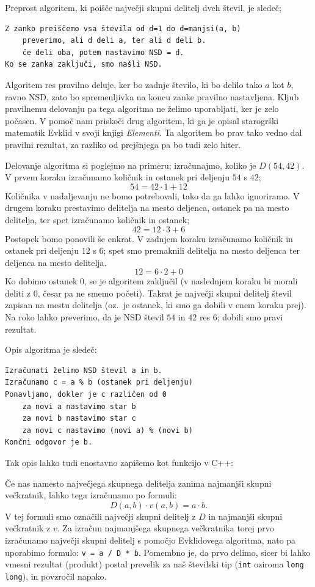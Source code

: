 \documentclass{book}
\begin{document}
Preprost algoritem, ki poišče največji skupni delitelj dveh števil, je sledeč;
\begin{verbatim}
Z zanko preiščemo vsa števila od d=1 do d=manjsi(a, b)
    preverimo, ali d deli a, ter ali d deli b.
    če deli oba, potem nastavimo NSD = d.
Ko se zanka zaključi, smo našli NSD.
\end{verbatim}
Algoritem res pravilno deluje, ker bo zadnje število, ki bo delilo tako $a$ kot
$b$, ravno NSD, zato bo spremenljivka na koncu zanke pravilno nastavljena.
Kljub pravilnemu delovanju pa tega algoritma ne želimo uporabljati, ker je zelo
počasen.
V pomoč nam priskoči drug algoritem, ki ga je opisal starogrški matematik Evklid
v svoji knjigi \emph{Elementi}.
Ta algoritem bo prav tako vedno dal pravilni rezultat, za razliko od prejšnjega
pa bo tudi zelo hiter.
\begin{examples}
  Delovanje algoritma si poglejmo na primeru; izračunajmo, koliko je $D(54,
  42)$.
  V prvem koraku izračunamo količnik in ostanek pri deljenju $54$ s $42$;
  \[
	54 = 42 \cdot 1 + 12
  \]
  Količnika v nadaljevanju ne bomo potrebovali, tako da ga lahko ignoriramo.
  V drugem koraku prestavimo delitelja na mesto deljenca, ostanek pa na mesto
  delitelja, ter spet izračunamo količnik in ostanek;
  \[
	42 = 12 \cdot 3 + 6
  \]
  Postopek bomo ponovili še enkrat.
  V zadnjem koraku izračunamo količnik in ostanek pri deljenju $12$ s $6$; spet
  smo premaknili delitelja na mesto deljenca ter deljenca na mesto delitelja.
  \[
	12 = 6 \cdot 2 + 0
  \]
  Ko dobimo ostanek $0$, se je algoritem zaključil (v naslednjem koraku bi
  morali deliti z $0$, česar pa ne smemo početi).
  Takrat je največji skupni delitelj števil zapisan na mestu delitelja
  (oz.~je ostanek, ki smo ga dobili v enem koraku prej).
  Na roko lahko preverimo, da je NSD števil $54$ in $42$ res $6$; dobili smo
  pravi rezultat.
\end{examples}

Opis algoritma je sledeč:
\begin{verbatim}
Izračunati želimo NSD števil a in b.
Izračunamo c = a % b (ostanek pri deljenju)
Ponavljamo, dokler je c različen od 0
    za novi a nastavimo star b
    za novi b nastavimo star c
    za novi c nastavimo (novi a) % (novi b)
Končni odgovor je b.
\end{verbatim}
Tak opis lahko tudi enostavno zapišemo kot funkcijo v C++:

Če nas namesto največjega skupnega delitelja zanima najmanjši skupni večkratnik,
lahko tega izračunamo po formuli:
\[
  D(a, b) \cdot v(a, b) = a \cdot b.
\]
V tej formuli smo označili največji skupni delitelj z $D$ in najmanjši skupni
večkratnik z $v$.
Za izračun najmanjšega skupnega večkratnika torej prvo izračunamo največji
skupni delitelj s pomočjo Evklidovega algoritma, nato pa uporabimo formulo:
\verb+v = a / D * b+.
Pomembno je, da prvo delimo, sicer bi lahko vmesni rezultat (produkt) postal
prevelik za naš številski tip (\verb+int+ oziroma \verb+long long+), in
povzročil napako.
\end{document}
